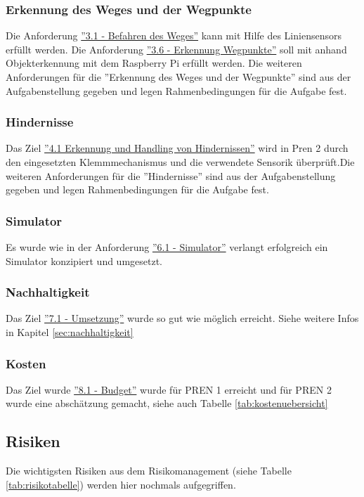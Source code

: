\documentclass[../main.tex]{subfiles}
\begin{document}
\subsubsection{Erkennung des Weges und der Wegpunkte}

Die Anforderung \hyperlink{A3.1}{''3.1 - Befahren des Weges''} kann mit Hilfe des Liniensensors erfüllt werden. Die Anforderung \hyperlink{A3.6}{''3.6 - Erkennung Wegpunkte''} soll mit anhand Objekterkennung mit dem Raspberry Pi erfüllt werden. Die weiteren Anforderungen für die ''Erkennung des Weges und der Wegpunkte'' sind aus der Aufgabenstellung gegeben und legen Rahmenbedingungen für die Aufgabe fest.

\subsubsection{Hindernisse}

Das Ziel \hyperlink{A4.1}{''4.1 Erkennung und Handling von Hindernissen''} wird in Pren 2 durch den eingesetzten Klemmmechanismus und die verwendete Sensorik überprüft.Die weiteren Anforderungen für die ''Hindernisse'' sind aus der Aufgabenstellung gegeben und legen Rahmenbedingungen für die Aufgabe fest.


\subsubsection{Simulator}

Es wurde wie in der Anforderung \hyperlink{A6.1}{''6.1 - Simulator''} verlangt erfolgreich ein Simulator konzipiert und umgesetzt.

\subsubsection{Nachhaltigkeit}
Das Ziel \hyperlink{A7.1}{''7.1 - Umsetzung''} wurde so gut wie möglich erreicht. Siehe weitere Infos in Kapitel \ref{sec:nachhaltigkeit}

\subsubsection{Kosten}
Das Ziel wurde  \hyperlink{A8.1}{''8.1 - Budget''} wurde für PREN 1 erreicht und für PREN 2 wurde eine abschätzung gemacht, siehe auch Tabelle \ref{tab:kostenuebersicht}

\newpage
\subsection{Risiken}
Die wichtigsten Risiken aus dem Risikomanagement (siehe Tabelle \ref{tab:risikotabelle}) werden hier nochmals aufgegriffen.
\end{document}

